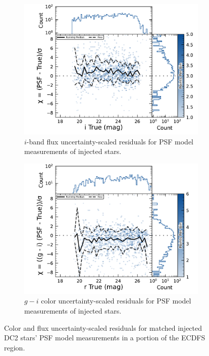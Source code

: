 \begin{figure}[hbt!]
  \centering
  \begin{subfigure}[t]{0.45\textwidth}
  \includegraphics[width=\linewidth]{injected_lsst_cells_v1_5063_i_mag_chi_psf}
  \caption{$i$-band flux uncertainty-scaled residuals for PSF model measurements of injected stars.}
  \end{subfigure}\hfill
  \begin{subfigure}[t]{0.45\textwidth}
  \includegraphics[width=\linewidth]{injected_lsst_cells_v1_5063_r_color_chi_psf_g_minus_i}
  \caption{$g-i$ color uncertainty-scaled residuals for PSF model measurements of injected stars.}
  \end{subfigure}\hfill
\caption{Color and flux uncertainty-scaled residuals for matched injected DC2 stars' PSF model measurements in a portion of the \gls{ECDFS} region.}
\label{fig:injected_lsst_cells_v1_5063_star_psf_chi}
\end{figure}

